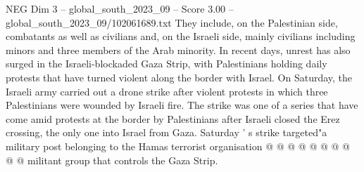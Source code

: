 \begin{textsample}{NEG Dim 3 – global\_south\_2023\_09 – Score 3.00 – global\_south\_2023\_09/102061689.txt}
They include, on the Palestinian side, combatants as well as civilians and, on the Israeli side, mainly civilians including minors and three members of the Arab minority.
In recent days, unrest has also surged in the Israeli-blockaded Gaza Strip, with Palestinians holding daily protests that have turned violent along the border with Israel.
On Saturday, the Israeli army carried out a drone strike after violent protests in which three Palestinians were wounded by Israeli fire.
The strike was one of a series that have come amid protests at the border by Palestinians after Israeli closed the Erez crossing, the only one into Israel from Gaza.
Saturday ' s strike targeted"a military post belonging to the Hamas terrorist organisation @ @ @ @ @ @ @ @ @ @ militant group that controls the Gaza Strip.

\end{textsample}

